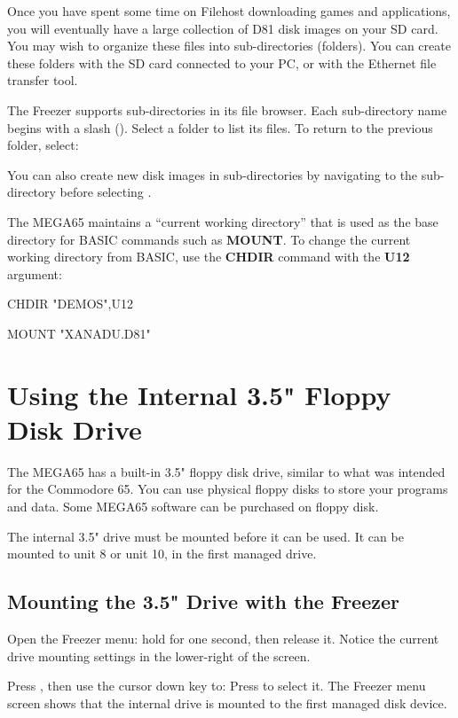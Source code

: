 Once you have spent some time on Filehost downloading games and applications, you will eventually have a large collection of D81 disk images on your SD card. You may wish to organize these files into sub-directories (folders). You can create these folders with the SD card connected to your PC, or with the Ethernet file transfer tool.

The Freezer supports sub-directories in its file browser. Each sub-directory name begins with a slash (\screentext{/}). Select a folder to list its files. To return to the previous folder, select: 

You can also create new disk images in sub-directories by navigating to the sub-directory before selecting .

The MEGA65 maintains a ``current working directory'' that is used as the base directory for BASIC commands such as {\bf MOUNT}. To change the current working directory from BASIC, use the {\bf CHDIR} command with the {\bf U12} argument:

\begin{screenoutput}
CHDIR "DEMOS",U12

MOUNT "XANADU.D81"
\end{screenoutput}


\section{Using the Internal 3.5" Floppy Disk Drive}

The MEGA65 has a built-in 3.5" floppy disk drive, similar to what was intended for the Commodore 65. You can use physical floppy disks to store your programs and data. Some MEGA65 software can be purchased on floppy disk.

The internal 3.5" drive must be mounted before it can be used. It can be mounted to unit 8 or unit 10, in the first managed drive.

\subsection{Mounting the 3.5" Drive with the Freezer}

Open the Freezer menu: hold  for one second, then release it. Notice the current drive mounting settings in the lower-right of the screen.

Press , then use the cursor down key to:  Press  to select it. The Freezer menu screen shows that the internal drive is mounted to the first managed disk device.

